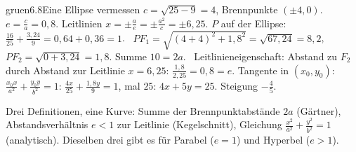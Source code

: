 \begin{loesungkarte}{gruen}{6.8}{Eine Ellipse vermessen}
$c = \sqrt{25 - 9} = 4$, Brennpunkte $(\pm4, 0)$. $e = \frac ca = 0{,}8$. Leitlinien $x = \pm\frac ae = \pm\frac{a^{2}}c = \pm6{,}25$.
$P$ auf der Ellipse: $\frac{16}{25} + \frac{3{,}24}9 = 0{,}64 + 0{,}36 = 1$. \checkmark\ $PF_1 = \sqrt{(4 + 4)^{2} + 1{,}8^{2}} = \sqrt{67{,}24} = 8{,}2$, $PF_2 = \sqrt{0 + 3{,}24} = 1{,}8$. Summe $10 = 2a$. \checkmark\ Leitlinieneigenschaft: Abstand zu $F_2$ durch Abstand zur Leitlinie $x = 6{,}25$: $\frac{1{,}8}{2{,}25} = 0{,}8 = e$. \checkmark
{}
Tangente in $(x_0, y_0)$: $\frac{x_0x}{a^{2}} + \frac{y_0y}{b^{2}} = 1$: $\frac{4x}{25} + \frac{1{,}8y}9 = 1$, mal $25$: $4x + 5y = 25$. Steigung $-\frac45$.
\begin{mitnehmen}\kastentext
Drei Definitionen, eine Kurve: Summe der Brennpunktabstände $2a$ (Gärtner), Abstandsverhältnis $e < 1$ zur Leitlinie (Kegelschnitt), Gleichung $\frac{x^{2}}{a^{2}} + \frac{y^{2}}{b^{2}} = 1$ (analytisch). Dieselben drei gibt es für Parabel ($e = 1$) und Hyperbel ($e > 1$).
\end{mitnehmen}
\end{loesungkarte}

